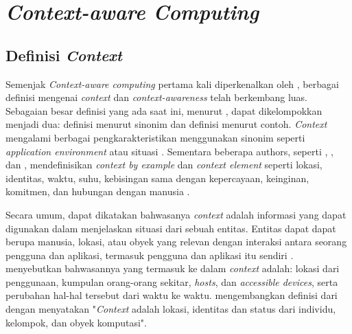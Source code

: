 \section{\textit{Context-aware Computing}}
\label{sec:context-aware-computing}


\subsection{Definisi \textit{Context}}
\label{ssec:context-definition}
Semenjak \textit{Context-aware computing} pertama kali diperkenalkan oleh \citep{schilit_context-aware_1994}, berbagai definisi mengenai \textit{context} dan \textit{context-awareness} telah berkembang luas. Sebagaian besar definisi yang ada saat ini, menurut \citep{zimmermann_operational_2007}, dapat dikelompokkan menjadi dua: definisi menurut sinonim dan definisi menurut contoh. \textit{Context} mengalami berbagai pengkarakteristikan menggunakan sinonim seperti \textit{application environment} \citep{hull_towards_1997} atau situasi \citep{brown_stick-e_1995}. Sementara beberapa authors, seperti \citep{brown_context-aware_1997}, \citep{gross_awareness_2001}, dan \citep{ryan_enhanced_1999}, mendefinisikan \textit{context by example} dan \textit{context element} seperti lokasi, identitas, waktu, suhu, kebisingan sama dengan kepercayaan, keinginan, komitmen, dan hubungan dengan manusia \citep{chen_intelligent_2003}.


Secara umum, dapat dikatakan bahwasanya \textit{context} adalah informasi yang dapat digunakan dalam menjelaskan situasi dari sebuah entitas. Entitas dapat dapat berupa manusia, lokasi, atau obyek yang relevan dengan interaksi antara seorang pengguna dan aplikasi, termasuk pengguna dan aplikasi itu sendiri \citep{dey_understanding_2001}. \citep{schilit_context-aware_1994} menyebutkan bahwasannya yang termasuk ke dalam \textit{context} adalah: lokasi dari penggunaan, kumpulan orang-orang sekitar, \textit{hosts}, dan \textit{accessible devices}, serta perubahan hal-hal tersebut dari waktu ke waktu. \citep{dey_understanding_2001} mengembangkan definisi dari \citep{schilit_context-aware_1994} dengan menyatakan "\textit{Context} adalah lokasi, identitas dan status dari individu, kelompok, dan obyek komputasi".


